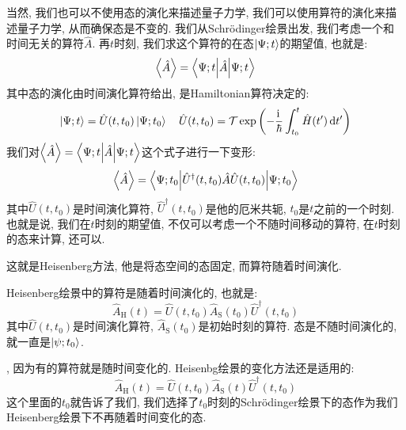 当然, 我们也可以不使用态的演化来描述量子力学, 我们可以使用算符的演化来描述量子力学, 从而确保态是不变的.
我们从Schrödinger绘景出发, 我们考虑一个和时间无关的算符$\hat{A}$.
再$t$时刻, 我们求这个算符的在态$\ket{\Psi;t}$的期望值, 也就是:
\begin{equation}
  \expval{\hat{A}} = \mel**{\Psi;t}{\hat{A}}{\Psi;t}
\end{equation}
其中态的演化由时间演化算符给出, 是Hamiltonian算符决定的:
\begin{equation}
  \ket{\Psi;t} = \hat{U}(t,t_0) \ket{\Psi;t_0} \quad \hat{U}(t,t_0) = \mathcal{T} \exp\left( -\frac{\mathrm{i}\,}{\hbar} \int_{t_0}^{t} \hat{H}(t') \dd{t'} \right)
\end{equation}
我们对$\expval{\hat{A}} = \mel**{\Psi;t}{\hat{A}}{\Psi;t}$这个式子进行一下变形:
\begin{equation}
  \expval{\hat{A}} = \mel**{\Psi;t_0}{\hat{U}^\dagger(t,t_0) \hat{A} \hat{U}(t,t_0)}{\Psi;t_0}
\end{equation}
其中$\hat{U}(t,t_0)$是时间演化算符, $\hat{U}^\dagger(t,t_0)$是他的厄米共轭, $t_0$是$t$之前的一个时刻.
也就是说, 我们在$t$时刻的期望值, 不仅可以考虑一个不随时间移动的算符, 在$t$时刻的态来计算, 还可以.


这就是Heisenberg方法, 他是将态空间的态固定, 而算符随着时间演化.
\begin{definition}[][Heisenberg方法]
  Heisenberg绘景中的算符是随着时间演化的, 也就是:
  \begin{equation}
    \hat{A}_{\text{H}}(t) = \hat{U}(t,t_0) \hat{A}_{\text{S}}(t_0) \hat{U}^\dagger(t,t_0)
  \end{equation}
  其中$\hat{U}(t,t_0)$是时间演化算符, $\hat{A}_{\text{S}}(t_0)$是初始时刻的算符.
  态是不随时间演化的, 就一直是$\ket{\psi;t_0}$.
\end{definition}
, 因为有的算符就是随时间变化的.
Heisenbg绘景的变化方法还是适用的:
\begin{equation}
  \hat{A}_{\text{H}}(t) = \hat{U}(t,t_0) \hat{A}_{\text{S}}(t) \hat{U}^\dagger(t,t_0)
\end{equation}
这个里面的$t_0$就告诉了我们, 我们选择了$t_0$时刻的Schrödinger绘景下的态作为我们Heisenberg绘景下不再随着时间变化的态.

